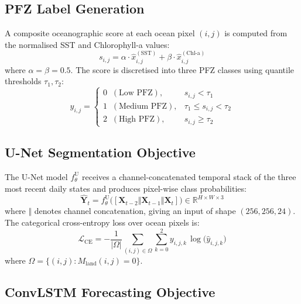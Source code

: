 \documentclass[conference]{IEEEtran}
\begin{document}
\subsection{PFZ Label Generation}

A composite oceanographic score at each ocean pixel $(i,j)$ is computed
from the normalised SST and Chlorophyll-a values:
\begin{equation}
s_{i,j} = \alpha \cdot \hat{x}_{i,j}^{(\text{SST})} + \beta \cdot
           \hat{x}_{i,j}^{(\text{Chl-a})}
\label{eq:score}
\end{equation}
where $\alpha = \beta = 0.5$. The score is discretised into three PFZ
classes using quantile thresholds $\tau_1, \tau_2$:
\begin{equation}
y_{i,j} =
\begin{cases}
0 \;\; (\text{Low PFZ}),     & s_{i,j} < \tau_1 \\
1 \;\; (\text{Medium PFZ}),  & \tau_1 \leq s_{i,j} < \tau_2 \\
2 \;\; (\text{High PFZ}),    & s_{i,j} \geq \tau_2
\end{cases}
\label{eq:label}
\end{equation}

\subsection{U-Net Segmentation Objective}

The U-Net model $f_{\theta}^{\text{U}}$ receives a channel-concatenated
temporal stack of the three most recent daily states and produces
pixel-wise class probabilities:
\begin{equation}
\hat{\mathbf{Y}}_t = f_{\theta}^{\text{U}}
  \bigl([\mathbf{X}_{t-2} \Vert \mathbf{X}_{t-1} \Vert \mathbf{X}_t]
  \bigr) \in \mathbb{R}^{H \times W \times 3}
\label{eq:unet}
\end{equation}
where $\Vert$ denotes channel concatenation, giving an input of shape
$(256, 256, 24)$. The categorical cross-entropy loss over ocean
pixels is:
\begin{equation}
\mathcal{L}_{\text{CE}} = -\frac{1}{|\Omega|}
  \sum_{(i,j) \in \Omega} \sum_{k=0}^{2}
  y_{i,j,k} \, \log\bigl(\hat{y}_{i,j,k}\bigr)
\label{eq:ce}
\end{equation}
where $\Omega = \{(i,j) : M_{\text{land}}(i,j) = 0\}$.

\subsection{ConvLSTM Forecasting Objective}
\end{document}
